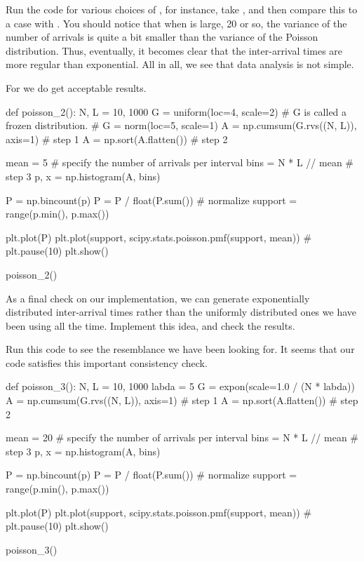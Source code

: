 \begin{exercise}
  Run the code for various choices of , for instance, take , and then compare this to a case with .
  You should notice that when  is large, 20 or so, the variance of the number of arrivals is quite a bit smaller than the variance of the Poisson distribution.
  Thus, eventually, it becomes clear that the inter-arrival times are more regular than exponential.
  All in all, we see that data analysis is not simple.
  \begin{solution}
For  we do get acceptable results.

\begin{pyverbatim}
def poisson_2():
    N, L = 10, 1000
    G = uniform(loc=4, scale=2)  # G is called a frozen distribution.
    # G = norm(loc=5, scale=1)
    A = np.cumsum(G.rvs((N, L)), axis=1) # step 1
    A = np.sort(A.flatten()) # step 2

    mean = 5  # specify the number of arrivals per interval
    bins = N * L // mean # step 3
    p, x = np.histogram(A, bins)

    P = np.bincount(p)
    P = P / float(P.sum())  # normalize
    support = range(p.min(), p.max())

    plt.plot(P)
    plt.plot(support, scipy.stats.poisson.pmf(support, mean))
    # plt.pause(10)
    plt.show()

poisson_2()
\end{pyverbatim}

\end{solution}
\end{exercise}

\begin{exercise}
  As a final check on our implementation, we can generate exponentially distributed inter-arrival times rather than the uniformly distributed ones we have been using all the time. Implement this idea, and check the results.
  \begin{solution}
    Run this code to see the resemblance we have been looking for.
    It seems that our code satisfies this important consistency check.

\begin{pyverbatim}
def poisson_3():
    N, L = 10, 1000
    labda = 5
    G = expon(scale=1.0 / (N * labda))
    A = np.cumsum(G.rvs((N, L)), axis=1) # step 1
    A = np.sort(A.flatten()) # step 2

    mean = 20  # specify the number of arrivals per interval
    bins = N * L // mean # step 3
    p, x = np.histogram(A, bins)

    P = np.bincount(p)
    P = P / float(P.sum())  # normalize
    support = range(p.min(), p.max())

    plt.plot(P)
    plt.plot(support, scipy.stats.poisson.pmf(support, mean))
    # plt.pause(10)
    plt.show()

poisson_3()
\end{pyverbatim}
  \end{solution}

\end{exercise}


